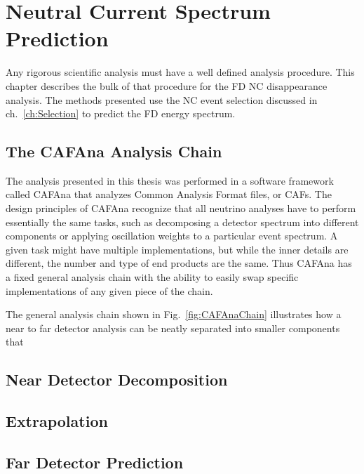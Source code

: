 \chapter{Neutral Current Spectrum Prediction}
\label{ch:Prediction}

Any rigorous scientific analysis must have a well defined analysis procedure. This chapter describes the bulk of that procedure for the FD NC disappearance analysis. The methods presented use the NC event selection discussed in ch.~\ref{ch:Selection} to predict the FD energy spectrum.

\section{The CAFAna Analysis Chain}

The analysis presented in this thesis was performed in a software framework called CAFAna that analyzes Common Analysis Format files, or CAFs. The design principles of CAFAna recognize that all neutrino analyses have to perform essentially the same tasks, such as decomposing a detector spectrum into different components or applying oscillation weights to a particular event spectrum. A given task might have multiple implementations, but while the inner details are different, the number and type of end products are the same. Thus CAFAna has a fixed general analysis chain with the ability to easily swap specific implementations of any given piece of the chain.

The general analysis chain shown in Fig.~\ref{fig:CAFAnaChain} illustrates how a near to far detector analysis can be neatly separated into smaller components that 

\section{Near Detector Decomposition}

\section{Extrapolation}

\section{Far Detector Prediction}